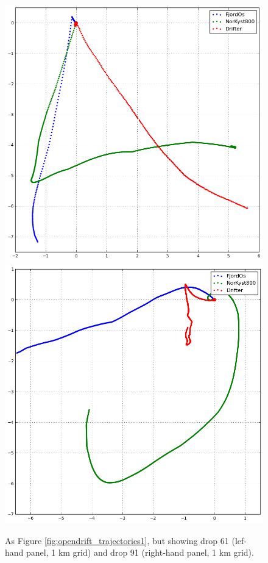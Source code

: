 \begin{figure}[htb]
	\centerline{
		\includegraphics*[width=.5\textwidth]{Figurer/opendrift/skillscore/drop61i5}
		\includegraphics*[width=.5\textwidth]{Figurer/opendrift/skillscore/drop91i11}
		}
	\caption{\small As Figure \ref{fig:opendrift_trajectories1}, but showing drop 61 (lef-hand panel, 1 km grid) and drop 91 (right-hand panel, 1 km grid).}
	\label{fig:opendrift_trajectories2a}
\end{figure}

